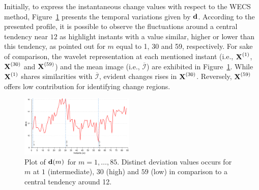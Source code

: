 \documentclass[journal]{IEEEtran}
\newcommand{\vd}{{\textbf d}}
\newcommand{\vX}{{\textbf X}}
\begin{document}
Initially, to express the instantaneous change values with respect to the WECS method,
Figure~\ref{F:forest_wecs} presents the temporal variations given by $\vd$. According to the presented profile, it is possible to observe the fluctuations around a central tendency near $12$ as highlight instants with a value similar, higher or lower than this tendency, as pointed out for $m$ equal to 1, 30 and 59, respectively.
%
For sake of comparison, the wavelet representation at each mentioned instant (i.e., $\vX^{(1)}$, $\vX^{(30)}$ and $\vX^{(59)}$) and the mean image (i.e., $\overline{\mathcal{I}}$) are exhibited in Figure~\ref{F:forest_wecs}. While $\vX^{(1)}$ shares similarities with $\overline{\mathcal{I}}$, evident changes rises in $\vX^{(30)}$. Reversely, $\vX^{(59)}$ offers low contribution for identifying change regions.



\begin{figure}[htb!]
\centering
\includegraphics[width=0.485\textwidth]{../../graphs/LineInstants_1-30-59.pdf}
\caption{Plot of $\vd(m)$ for $m=1,\ldots,85$. Distinct deviation values occurs for $m$ at $1$ (intermediate), $30$ (high) and $59$ (low) in comparison to a central tendency around 12.}\label{F:forest_wecs}
\end{figure}
\end{document}
